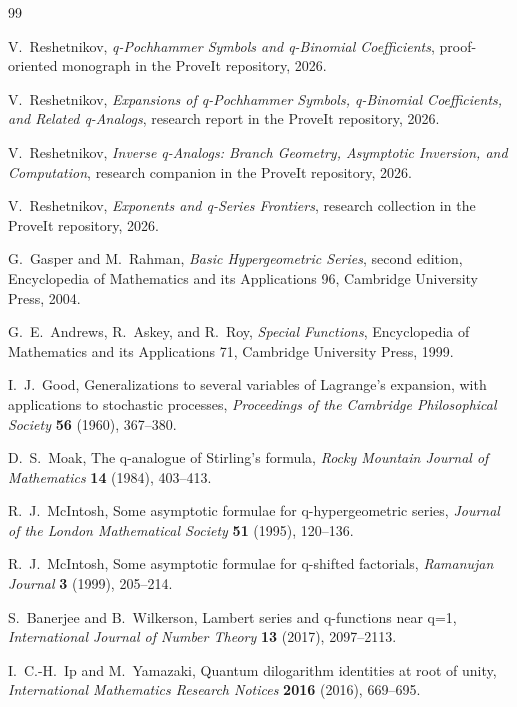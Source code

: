 \documentclass[11pt,letterpaper,oneside,openany]{book}
\theoremstyle{definition}
\theoremstyle{remark}
\begin{document}
\begin{thebibliography}{99}

V.~Reshetnikov,
\emph{q-Pochhammer Symbols and q-Binomial Coefficients},
proof-oriented monograph in the ProveIt repository, 2026.

V.~Reshetnikov,
\emph{Expansions of q-Pochhammer Symbols, q-Binomial Coefficients, and Related
q-Analogs},
research report in the ProveIt repository, 2026.

V.~Reshetnikov,
\emph{Inverse q-Analogs: Branch Geometry, Asymptotic Inversion, and
Computation},
research companion in the ProveIt repository, 2026.

V.~Reshetnikov,
\emph{Exponents and q-Series Frontiers},
research collection in the ProveIt repository, 2026.

G.~Gasper and M.~Rahman,
\emph{Basic Hypergeometric Series}, second edition,
Encyclopedia of Mathematics and its Applications 96,
Cambridge University Press, 2004.

G.~E.~Andrews, R.~Askey, and R.~Roy,
\emph{Special Functions},
Encyclopedia of Mathematics and its Applications 71,
Cambridge University Press, 1999.

I.~J.~Good,
Generalizations to several variables of Lagrange's expansion, with applications
to stochastic processes,
\emph{Proceedings of the Cambridge Philosophical Society} \textbf{56} (1960),
367--380.

D.~S.~Moak,
The q-analogue of Stirling's formula,
\emph{Rocky Mountain Journal of Mathematics} \textbf{14} (1984), 403--413.

R.~J.~McIntosh,
Some asymptotic formulae for q-hypergeometric series,
\emph{Journal of the London Mathematical Society} \textbf{51} (1995),
120--136.

R.~J.~McIntosh,
Some asymptotic formulae for q-shifted factorials,
\emph{Ramanujan Journal} \textbf{3} (1999), 205--214.

S.~Banerjee and B.~Wilkerson,
Lambert series and q-functions near q=1,
\emph{International Journal of Number Theory} \textbf{13} (2017), 2097--2113.

I.~C.-H.~Ip and M.~Yamazaki,
Quantum dilogarithm identities at root of unity,
\emph{International Mathematics Research Notices} \textbf{2016} (2016),
669--695.


\end{thebibliography}
\end{document}
